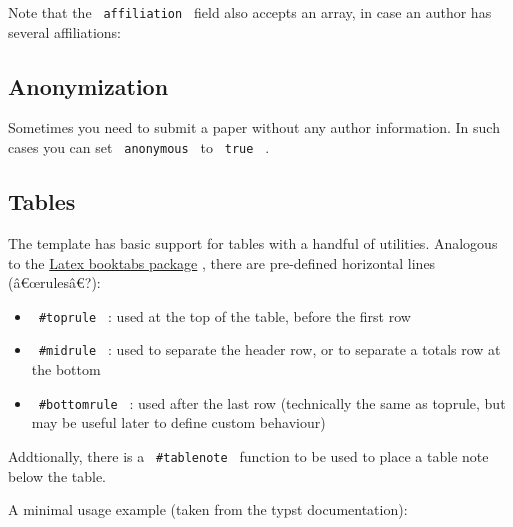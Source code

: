 Note that the \texttt{\ affiliation\ } field also accepts an array, in
case an author has several affiliations:

\begin{Shaded}
\begin{Highlighting}[]
\NormalTok{(}
\NormalTok{)}
\end{Highlighting}
\end{Shaded}

\subsection{Anonymization}\label{anonymization}

Sometimes you need to submit a paper without any author information. In
such cases you can set \texttt{\ anonymous\ } to \texttt{\ true\ } .

\subsection{Tables}\label{tables}

The template has basic support for tables with a handful of utilities.
Analogous to the \href{https://ctan.org/pkg/booktabs}{Latex booktabs
package} , there are pre-defined horizontal lines (â€œrulesâ€?):

\begin{itemize}
\tightlist
\item
  \texttt{\ \#toprule\ } : used at the top of the table, before the
  first row
\item
  \texttt{\ \#midrule\ } : used to separate the header row, or to
  separate a totals row at the bottom
\item
  \texttt{\ \#bottomrule\ } : used after the last row (technically the
  same as toprule, but may be useful later to define custom behaviour)
\end{itemize}

Addtionally, there is a \texttt{\ \#tablenote\ } function to be used to
place a table note below the table.

A minimal usage example (taken from the typst documentation):

